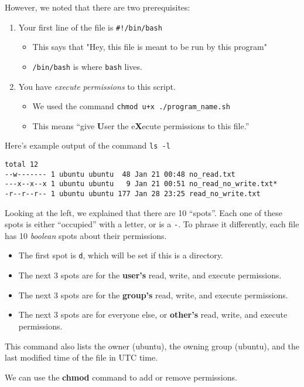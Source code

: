 \documentclass{article}
\begin{document}
However, we noted that there are two prerequisites:
\begin{enumerate}
    \item Your first line of the file is \lstinline|#!/bin/bash|
        \begin{itemize}
            \item This says that "Hey, this file is meant to be run by this program"
            \item \lstinline|/bin/bash| is where \lstinline|bash| lives.
        \end{itemize}

    \item You have \textit{execute permissions} to this script.
        \begin{itemize}
            \item We used the command \lstinline|chmod u+x ./program_name.sh|

            \item This means ``give \textbf{U}ser the e\textbf{X}ecute
                permissions to this file.''
        \end{itemize}
\end{enumerate}

Here's example output of the command \lstinline|ls -l|
\begin{verbatim}
total 12
--w------- 1 ubuntu ubuntu  48 Jan 21 00:48 no_read.txt
---x--x--x 1 ubuntu ubuntu   9 Jan 21 00:51 no_read_no_write.txt*
-r--r--r-- 1 ubuntu ubuntu 177 Jan 28 23:25 read_no_write.txt
\end{verbatim}

Looking at the left, we explained that there are 10 ``spots''. Each one of
these spots is either ``occupied'' with a letter, or is a \texttt{-}. To phrase
it differently, each file has 10 \textit{boolean} spots about their permissions.
\begin{itemize}
    \item The first spot is \texttt{d}, which will be set if this is a directory.
    \item The next 3 spots are for the \textbf{user's} read, write, and execute permissions.
    \item The next 3 spots are for the \textbf{group's} read, write, and execute permissions.
    \item The next 3 spots are for everyone else, or \textbf{other's} read, write, and execute permissions.
\end{itemize}

This command also lists the owner (ubuntu), the owning group (ubuntu), and the
last modified time of the file in UTC time.

We can use the \textbf{chmod} command to add or remove permissions.
\end{document}
